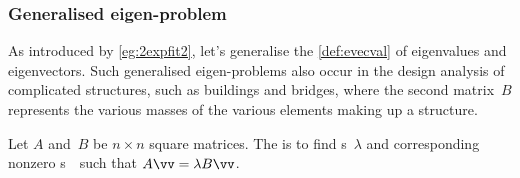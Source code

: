 \subsubsection{Generalised eigen-problem}


As introduced by \autoref{eg:2expfit2}, let's generalise the \autoref{def:evecval} of eigenvalues and eigenvectors.
Such generalised eigen-problems also occur in the design analysis of complicated structures, such as buildings and bridges, where the second matrix~\(B\) represents the various masses of the various elements making up a structure.

\begin{definition} \label{def:geneig}
Let \(A\) and~\(B\) be \(n\times n\) square matrices. 
The  is to find  s~\(\lambda\) and corresponding nonzero s~\vv\ such that \(A\vv=\lambda B\vv\).
\end{definition}


